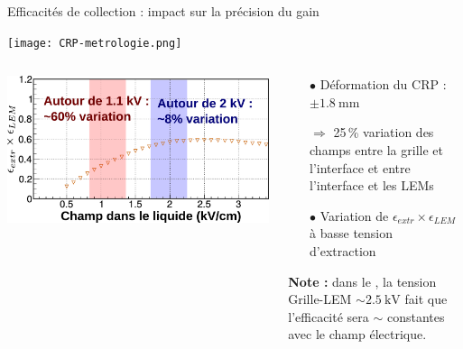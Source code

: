     \begin{frame}{Efficacités de collection : impact sur la précision du gain}
        \begin{center} \vspace{-0.5cm}\texttt{[image: CRP-metrologie.png]} \end{center}
        \begin{scriptsize}
            \begin{columns}
                \begin{column}{0.6\textwidth}
                    \centering \includegraphics[width=\textwidth]{./pictures/extr_eff.pdf}
                \end{column}\hfill
                \begin{column}{0.4\textwidth}
                    \begin{itemize}
       					\item[$\bullet$] Déformation du CRP : $\pm\SI{1.8}{\milli\meter}$
       					\item[$\Rightarrow$]  25\,\% variation des champs entre la grille et l'interface et entre l'interface et les LEMs
       					\item[$\bullet$] Variation de $\epsilon_{extr}\times\epsilon_{LEM}$ à basse tension d'extraction
       				\end{itemize}
                     \textbf{Note : } dans le \SSS{}, la tension Grille-LEM $\sim\SI{2.5}{\kilo\volt}$ fait que l'efficacité sera $\sim$ constantes avec le champ électrique.
                \end{column}
            \end{columns}
        \end{scriptsize}
    \end{frame}

